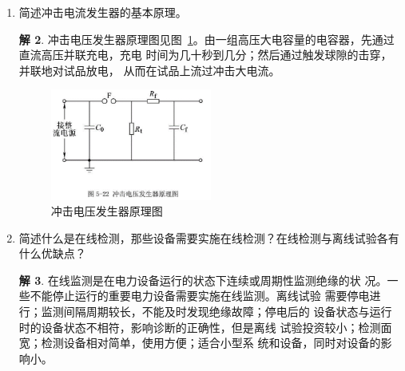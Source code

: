 \documentclass[zihao=-4,fontset = none]{ctexart}
\theoremstyle{definition}
\newtheorem*{solution}{解}
\begin{document}
\begin{enumerate}
\begin{solution}
    汤逊理论的基本观点是：电子的碰撞电离是气体放电时电流倍增的主要过程，而阴极表面的电子发射是维持放电的重要条件。

    流注理论的基本观点：
    \begin{enumerate}
      \item 以汤逊理论的碰撞电离为基础，强调空间电荷对电场的畸变作用，着重于用气体空间的光电离来解释气体放电通道的发展过程。
      \item 放电以起始到击穿并非碰撞电离连续量变的过程，当初始电子崩中
      离子数达到 \num{e8} 以上时，要引起空间光电离这样一个质的变化，此时
      由光子造成的二次崩向主崩汇合而形成流注。
      \item 流注一旦形成，放电就转入自持。
    \end{enumerate}
  \end{solution}
  \item 简述冲击电流发生器的基本原理。
  \begin{solution}
    冲击电压发生器原理图见图~\ref{fig:3-3}。由一组高压大电容量的电容器，先通过直流高压并联充电，充电
    时间为几十秒到几分；然后通过触发球隙的击穿，并联地对试品放电，
    从而在试品上流过冲击大电流。
    \begin{figure}[htbp]
      \centering
      \includegraphics[width=0.5\textwidth]{6.png}
      \caption{冲击电压发生器原理图}\label{fig:3-3}
    \end{figure}
  \end{solution}
  \item 简述什么是在线检测，那些设备需要实施在线检测？在线检测与离线试验各有什么优缺点？
  \begin{solution}
    在线监测是在电力设备运行的状态下连续或周期性监测绝缘的状
    况。一些不能停止运行的重要电力设备需要实施在线监测。离线试验
    需要停电进行；监测间隔周期较长，不能及时发现绝缘故障；停电后的
    设备状态与运行时的设备状态不相符，影响诊断的正确性，但是离线
    试验投资较小；检测面宽；检测设备相对简单，使用方便；适合小型系
    统和设备，同时对设备的影响小。
  \end{solution}
\end{enumerate}
\end{document}
